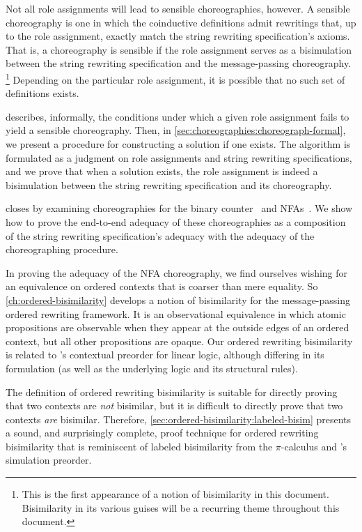Not all role assignments will lead to sensible choreographies, however.
A sensible choreography is one in which the coinductive definitions admit rewritings that, up to the role assignment, exactly match the string rewriting specification's axioms.
That is, a choreography is sensible if the role assignment serves as a bisimulation between the string rewriting specification and the message-passing choreography.%
\footnote{This is the first appearance of a notion of bisimilarity in this document.
Bisimilarity in its various guises will be a recurring theme throughout this document.}
Depending on the particular role assignment, it is possible that no such set of definitions exists.

 describes, informally, the conditions under which a given role assignment fails to yield a sensible choreography.
Then, in \cref{sec:choreographies:choreograph-formal}, we present a procedure for constructing a solution if one exists.
The algorithm is formulated as a judgment on role assignments and string rewriting specifications, and we prove that when a solution exists, the role assignment is indeed a bisimulation between the string rewriting specification and its choreography.

 closes by examining choreographies for the binary counter~ and \acsp*{NFA}~.
We show how to prove the end-to-end adequacy of these choreographies as a composition of the string rewriting specification's adequacy with the adequacy of the choreographing procedure.

In proving the adequacy of the \acs*{NFA} choreography, we find ourselves wishing for an equivalence on ordered contexts that is coarser than mere equality.
So \cref{ch:ordered-bisimilarity} develops a notion of bisimilarity for the message-passing ordered rewriting framework.
It is an observational equivalence in which atomic propositions are observable when they appear at the outside edges of an ordered context, but all other propositions are opaque.
Our ordered rewriting bisimilarity is related to \citeauthor{Deng+:MSCS16}'s contextual preorder for linear logic\autocite{Deng+:MSCS16}, although differing in its formulation (as well as the underlying logic and its structural rules).

The definition of ordered rewriting bisimilarity is suitable for directly proving that two contexts are \emph{not} bisimilar, but it is difficult to directly prove that two contexts \emph{are} bisimilar.
Therefore, \cref{sec:ordered-bisimilarity:labeled-bisim} presents a sound, and surprisingly complete, proof technique for ordered rewriting bisimilarity that is reminiscent of labeled bisimilarity from the $\pi$-calculus\autocite{Sangiorgi+Walker:CUP03} and \citeauthor{Deng+:MSCS16}'s simulation preorder\autocite{Deng+:MSCS16}.

